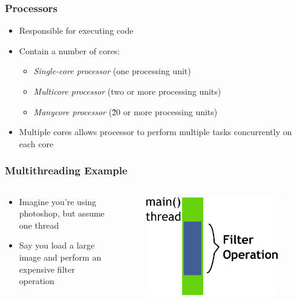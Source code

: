 \documentclass{beamer}
\newcommand{\linespace}{\vskip 0.25cm}
\begin{document}
\begin{frame}
\frametitle{Processors}
	\begin{itemize}
	\item Responsible for executing code
	\linespace
	\item Contain a number of cores:
	\begin{itemize}
		\item \emph{Single-core processor} (one processing unit) 
		\item \emph{Multicore processor} (two or more processing units)
		\item \emph{Manycore processor} (\~20 or more processing units)
	\end{itemize}
	\linespace
	\item Multiple cores allows processor to perform multiple tasks concurrently on each core
	\end{itemize}
\end{frame}

\begin{frame}
\frametitle{Multithreading Example}

\begin{columns}
	\begin{column}{0.5\textwidth}
		\linespace
		\begin{itemize}
		\item Imagine you're using photoshop, but assume one thread
		\item Say you load a large image and perform an expensive filter operation
		\end{itemize}
		\end{column}
	\begin{column}{0.5\textwidth}
		\begin{figure}
		\includegraphics[width=0.95\textwidth]{Illustrations/ThreadExample_GUI_Part1}
		\label{fig:single_photoshop}
		\end{figure}
	\end{column}
\end{columns}

\end{frame}
\end{document}
